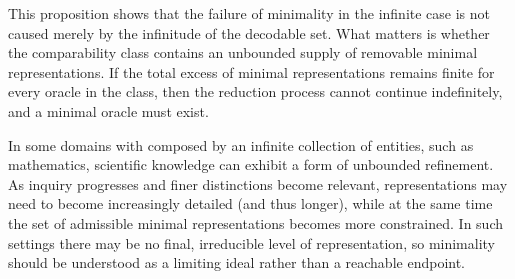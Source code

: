 This proposition shows that the failure of minimality in the infinite case is not caused merely by the infinitude of the decodable set. What matters is whether the comparability class contains an unbounded supply of removable minimal representations. If the total excess of minimal representations remains finite for every oracle in the class, then the reduction process cannot continue indefinitely, and a minimal oracle must exist.

In some domains with composed by an infinite collection of entities, such as mathematics, scientific knowledge can exhibit a form of unbounded refinement. As inquiry progresses and finer distinctions become relevant, representations may need to become increasingly detailed (and thus longer), while at the same time the set of admissible minimal representations becomes more constrained. In such settings there may be no final, irreducible level of representation, so minimality should be understood as a limiting ideal rather than a reachable endpoint.

